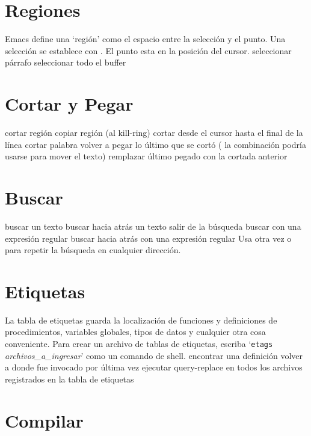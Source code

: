 \section{Regiones}

Emacs define una `regi{\'o}n' como el espacio entre la selecci{\'o}n y el
punto.  Una selecci{\'o}n se establece con .
El punto esta en la posici{\'o}n del cursor.
\askip
{} seleccionar p{\'a}rrafo
 seleccionar todo el buffer

\section{Cortar y Pegar}

 cortar regi{\'o}n
 copiar regi{\'o}n (al kill-ring)
 cortar desde el cursor hasta el final de la l{\'i}nea
 cortar palabra
 volver a pegar lo {\'u}ltimo que se cort{\'o} ( la
  combinaci{\'o}n podr{\'i}a usarse
para mover el texto)
 remplazar {\'u}ltimo pegado con la cortada anterior

\section{Buscar}

 buscar un texto
 buscar hacia atr{\'a}s un texto
 salir de la b{\'u}squeda
 buscar con una expresi{\'o}n regular
 buscar hacia atr{\'a}s con una expresi{\'o}n regular
\askip
Usa otra vez  o  para repetir la b{\'u}squeda en
cualquier direcci{\'o}n.

\section{Etiquetas}

La tabla de etiquetas guarda la localizaci{\'o}n de funciones y definiciones
de procedimientos, variables globales, tipos de datos y cualquier otra
cosa conveniente.  Para crear un archivo de tablas de etiquetas, escriba
`{\tt etags} {\it archivos\_a\_ingresar}' como un comando de shell.
\askip
{} encontrar una definici{\'o}n
 volver a donde  fue invocado por {\'u}ltima vez
 ejecutar query-replace en todos los archivos
  registrados en la tabla de etiquetas

\section{Compilar}

